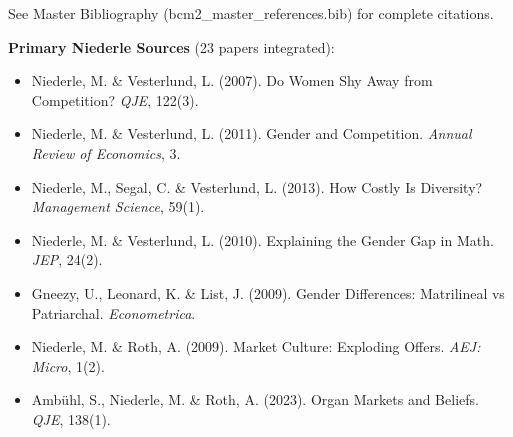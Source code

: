 See Master Bibliography (bcm2\_master\_references.bib) for complete citations.

\nocite{bcm_master}

\textbf{Primary Niederle Sources} (23 papers integrated):

\begin{itemize}
    \item Niederle, M. \& Vesterlund, L. (2007). Do Women Shy Away from Competition? \textit{QJE}, 122(3).
    \item Niederle, M. \& Vesterlund, L. (2011). Gender and Competition. \textit{Annual Review of Economics}, 3.
    \item Niederle, M., Segal, C. \& Vesterlund, L. (2013). How Costly Is Diversity? \textit{Management Science}, 59(1).
    \item Niederle, M. \& Vesterlund, L. (2010). Explaining the Gender Gap in Math. \textit{JEP}, 24(2).
    \item Gneezy, U., Leonard, K. \& List, J. (2009). Gender Differences: Matrilineal vs Patriarchal. \textit{Econometrica}.
    \item Niederle, M. \& Roth, A. (2009). Market Culture: Exploding Offers. \textit{AEJ: Micro}, 1(2).
    \item Ambühl, S., Niederle, M. \& Roth, A. (2023). Organ Markets and Beliefs. \textit{QJE}, 138(1).
\end{itemize}


